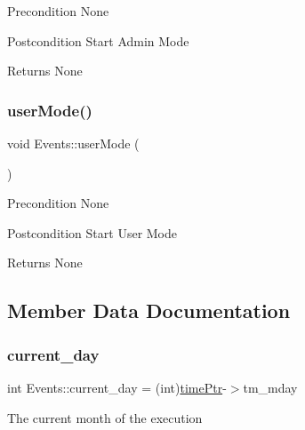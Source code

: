 \begin{DoxyPrecond}{Precondition}
None 
\end{DoxyPrecond}
\begin{DoxyPostcond}{Postcondition}
Start Admin Mode 
\end{DoxyPostcond}
\begin{DoxyReturn}{Returns}
None 
\end{DoxyReturn}
\mbox{\label{classEvents_a2fdb7c40bf64aa2e23d3d92dc7ab4d35}} 
\subsubsection{\texorpdfstring{user\+Mode()}{userMode()}}
{\footnotesize\ttfamily void Events\+::user\+Mode (\begin{DoxyParamCaption}{ }\end{DoxyParamCaption})\hspace{0.3cm}{\ttfamily [static]}}

\begin{DoxyPrecond}{Precondition}
None 
\end{DoxyPrecond}
\begin{DoxyPostcond}{Postcondition}
Start User Mode 
\end{DoxyPostcond}
\begin{DoxyReturn}{Returns}
None 
\end{DoxyReturn}


\subsection{Member Data Documentation}
\mbox{\label{classEvents_acd42b7f13cdfc41a0a6c3c6fb399da2a}} 
\subsubsection{\texorpdfstring{current\+\_\+day}{current\_day}}
{\footnotesize\ttfamily int Events\+::current\+\_\+day = (int)\hyperlink{classEvents_ad5ad3f8eb6f5d0875ab7a74fb2bb06e5}{time\+Ptr}-\/$>$tm\+\_\+mday\hspace{0.3cm}{\ttfamily [static]}}

The current month of the execution \mbox{\label{classEvents_a8a522493c1697161ca70c39232c7464b}} 
